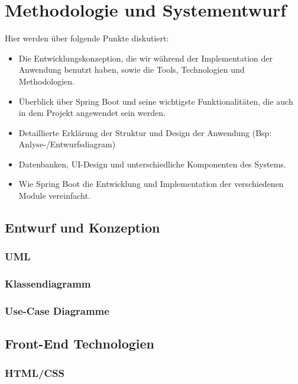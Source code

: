 \chapter{Methodologie und Systementwurf }

Hier werden über folgende Punkte diskutiert:

\begin{itemize}
	\item Die Entwicklungskonzeption, die wir während der Implementation der Anwendung benutzt haben, sowie die Tools, Technologien und Methodologien. 
	\item Überblick über Spring Boot und seine wichtigste  Funktionalitäten, die auch in dem Projekt angewendet sein werden. 
	\item Detaillierte Erklärung der Struktur und Design der Anwendung (Bsp: Anlyse-/Entwurfsdiagram) 
	\item Datenbanken, UI-Design und unterschiedliche Komponenten des Systems. 
	\item Wie Spring Boot die Entwicklung und Implementation der verschiedenen Module vereinfacht. 
\end{itemize}


\section{Entwurf und Konzeption}

\subsection{UML}

\subsection{Klassendiagramm}

\subsection{Use-Case Diagramme}


\section{Front-End Technologien}

\subsection{HTML/CSS}

